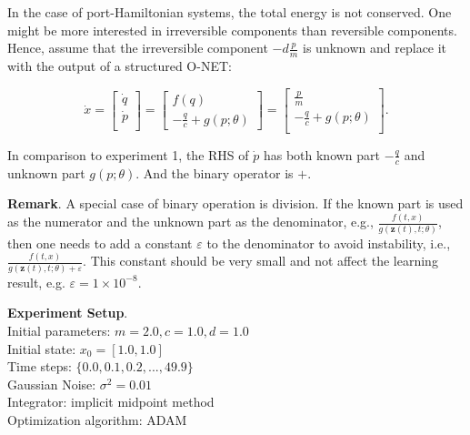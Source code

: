 \documentclass[
	parskip, 			   %
	twoside, 			   %
	DIV=14, 			   %
	BCOR=15.0mm, 		   %
	headsepline, 		   %
	open=right, 		   %
	captions=tableheading, %
	bibliography=totoc,    %
	numbers=noenddot       %
]{scrreprt}
\begin{document}
In the case of port-Hamiltonian systems, the total energy is not conserved. One might be more interested in irreversible components than reversible components. Hence, assume that the irreversible component $-d\frac{p}{m}$ is unknown and replace it with the output of a structured O-NET:

\begin{equation}
    \label{eq:structured_ODE_idho}
    \dot{x} =
    \begin{bmatrix}
    \dot{q}\\
    \dot{p}\\
    \end{bmatrix}
    =
    \begin{bmatrix}
    {f(q)}\\
    -\frac{q}{c} + {g(p;\theta)}
    \end{bmatrix}
    =
    \begin{bmatrix}
    \frac{p}{m}\\
    -\frac{q}{c} + {g(p;\theta)}\\
    \end{bmatrix}.
\end{equation}

In comparison to experiment 1, the RHS of $\dot{p}$ has both known part $-\frac{q}{c}$ and unknown part $g(p;\theta)$. And the binary operator is $+$.

\textbf{Remark}. A special case of binary operation is division. If the known part is used as the numerator and the unknown part as the denominator, e.g., $\frac{f(t, x)}{g(\mathbf{z}(t), t; \theta)}$, then one needs to add a constant $\varepsilon$ to the denominator to avoid instability, i.e., $\frac{f(t, x)}{g(\mathbf{z}(t), t; \theta) + \varepsilon}$. This constant should be very small and not affect the learning result, e.g. $\varepsilon = 1 \times 10^{-8}$.

\textbf{Experiment Setup}.\\
Initial parameters: $m = 2.0, c = 1.0, d = 1.0$\\
Initial state: $x_0 = [1.0, 1.0]$\\
Time steps: $\{ 0.0, 0.1, 0.2, ..., 49.9 \}$\\
Gaussian Noise: $\sigma^2 = 0.01$\\
Integrator: implicit midpoint method\\
Optimization algorithm: ADAM
\end{document}
